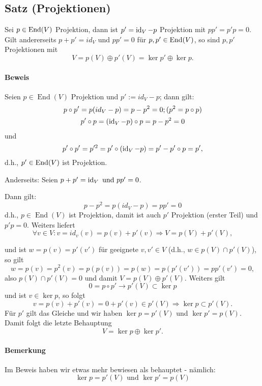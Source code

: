 \subsection{Satz (Projektionen)}
	\begin{Satz}[Projektionen]
	Sei $ p\in \operatorname{End}(V) $ Projektion, dann ist $ p'= \operatorname{id}_V-p $ Projektion mit $ pp' = p'p = 0 $. Gilt andererseits $ p+p' = id_V $ und $ pp' = 0 $ für $ p,p' \in \operatorname{End}(V) $, so sind $ p,p' $ Projektionen mit
		\[ V = p(V)\oplus p'(V) = \ker p' \oplus \ker p. \]
	\end{Satz}

\paragraph{Beweis}
	Seien $p\in \operatorname{End}(V)$ Projektion und $p' := id_V -p$; dann gilt:
		\begin{gather*}
		p\circ p' = p(id_V-p)=p-p^{2} = 0; (p^{2} = p\circ p)\\
		p'\circ p = (\operatorname{id}_V-p)\circ p = p - p^{2} = 0
		\end{gather*}
	und
		\[p' \circ p' = p'^2 = p' \circ(\operatorname{id}_V-p)=p'-p'\circ p = p',\]
	d.h., $p'\in\operatorname{End}(V)$ ist Projektion.
	
	Anderseits: Seien $p+p' = \operatorname{id}_V \text{ und } pp' = 0$.
		
	Dann gilt:
		\[p-p^2 = p(id_V-p) = pp' = 0\]
	d.h., $p\in\operatorname{End}(V)$ ist Projektion, damit ist auch $p'$ Projektion (erster Teil) und $p' p = 0 $. Weiters liefert
		\[\forall v\in V: v=id_v(v) = p(v) + p'(v) \Rightarrow V = p(V)+p'(V),\]

	und ist $w = p(v)= p'(v')$ für geeignete $v,v'\in V$ (d.h., $w \in p(V)\cap p'(V)$), so gilt
		\[ w = p(v) = p^2(v) = p(p(v)) = p(w) = p(p'(v')) = pp'(v') = 0, \]
	also $p(V)\cap p'(V) = {0}$ und damit $V = p(V)\oplus p'(V)$. Weiters gilt
		\[0 = p \circ p' \rightarrow p'(V)\subset \ker p\]
	und ist $v\in \ker p$, so folgt
		\[v = p(v) + p'(v) = 0 + p'(v)\in p'(V) \Rightarrow \ker p \subset p'(V).\]
	Für $p'$ gilt das Gleiche und wir haben $\ker p = p'(V)$ und $\ker p' = p(V)$.
	Damit folgt die letzte Behauptung 
		\[V = \ker p \oplus\ker p'.\]
	
\paragraph{Bemerkung}
	Im Beweis haben wir etwas mehr bewiesen als behauptet - nämlich:
		\[ \ker p = p'(V)\text{ und }\ker p' = p(V) \]
		
